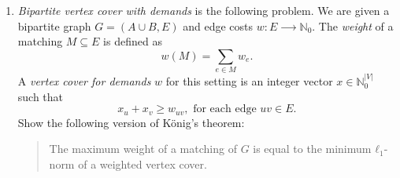 \documentclass[11pt]{article}
\begin{document}
\begin{enumerate}[1)]
\begin{enumerate}[a)]
    Describe the final integer programming problem that links some of the variables to the input Sudoku. 
    
  \end{enumerate}

\item \label{e:weighted-vextex-cover}
\emph{Bipartite vertex cover with demands} is the following problem. We are given a bipartite graph $G = (A\cup B,E)$ and edge costs $w: E ⟶ ℕ_0$. The \emph{weight} of a matching  $M ⊆ E$ is defined as  
  \begin{displaymath}
   w(M) = ∑_{e∈M} w_e. 
  \end{displaymath}
  A \emph{vertex cover for demands} $w$  for this setting is an integer vector $x ∈ ℕ_0^{|V|}$ such that
    \begin{displaymath}
      x_u + x_v ≥ w_{uv}, \text{ for each edge } uv ∈ E. 
    \end{displaymath}
    Show the following version of König's theorem:
    \begin{quote}
      The maximum weight of a matching of $G$ is equal to the minimum $ℓ_1$-norm of a weighted vertex cover. 
    \end{quote}
    
\end{enumerate}



  
\end{document}
